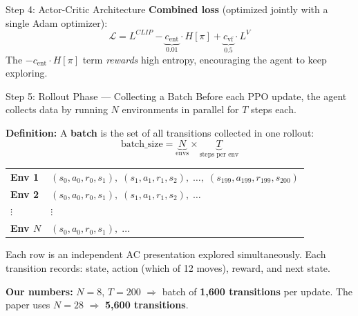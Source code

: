 \documentclass[aspectratio=169,11pt]{beamer}
\begin{document}
\begin{frame}{Step 4: Actor-Critic Architecture}
  \smallskip
  \textbf{Combined loss} (optimized jointly with a single Adam optimizer):
  \[
    \mathcal{L} = L^{CLIP}
    - \underbrace{c_\text{ent}}_{\scriptscriptstyle 0.01} \cdot H[\pi]
    + \underbrace{c_\text{vf}}_{\scriptscriptstyle 0.5} \cdot L^V
  \]
  The $-c_\text{ent}\cdot H[\pi]$ term \emph{rewards} high entropy, encouraging the agent to keep exploring.
\end{frame}

\begin{frame}{Step 5: Rollout Phase --- Collecting a Batch}
  \small
  Before each PPO update, the agent collects data by running $N$ environments
  in parallel for $T$ steps each.

  \medskip
  \textbf{Definition:} A \textbf{batch} is the set of all transitions collected in one rollout:
  \[
    \text{batch\_size} = \underbrace{N}_{\text{envs}} \times \underbrace{T}_{\text{steps per env}}
  \]
  \vspace{-8pt}

  \begin{center}
  \scriptsize
  \begin{tabular}{p{1.3cm}p{10cm}}
    \toprule
    \textbf{Env 1} & $(s_0, a_0, r_0, s_1),\; (s_1, a_1, r_1, s_2),\; \ldots,\; (s_{199}, a_{199}, r_{199}, s_{200})$ \\
    \textbf{Env 2} & $(s_0, a_0, r_0, s_1),\; (s_1, a_1, r_1, s_2),\; \ldots$ \\
    $\vdots$ & $\vdots$ \\
    \textbf{Env $N$} & $(s_0, a_0, r_0, s_1),\; \ldots$ \\
    \bottomrule
  \end{tabular}
  \end{center}

  \smallskip
  Each row is an independent AC presentation explored simultaneously.
  Each transition records: state, action (which of 12 moves), reward, and next state.

  \medskip
  \textbf{Our numbers:} $N = 8$, $T = 200$ $\Rightarrow$ batch of \textbf{1{,}600 transitions}
  per update.  The paper uses $N = 28$ $\Rightarrow$ \textbf{5{,}600 transitions}.
\end{frame}
\end{document}
